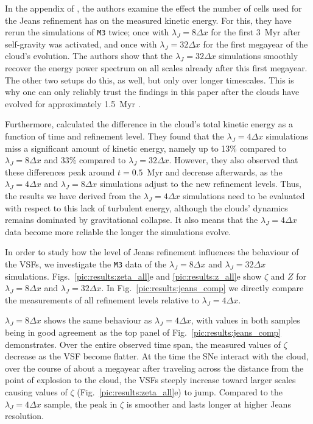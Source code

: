 In the appendix of , the authors examine the effect the number of cells used for the Jeans refinement has on the measured kinetic energy.
For this, they have rerun the simulations of \texttt{M3} twice; 
once with $\lambda_J=8\Delta{}x$ for the first 3~Myr after self-gravity was activated, and once with $\lambda_J=32\Delta{}x$ for the first megayear of the cloud's evolution.
The authors show that the $\lambda_J=32\Delta{}x$ simulations smoothly recover the energy power spectrum on all scales already after this first megayear.
The other two setups do this, as well, but only over longer timescales.
This is why one can only reliably trust the findings in this paper after the clouds have evolved for approximately 1.5~Myr \citep[see also][]{IbanezMejia2017,Seifried2017b}.

Furthermore,  calculated the difference in the cloud's total kinetic energy as a function of time and refinement level.
They found that the $\lambda_J = 4\Delta{}x$ simulations miss a significant amount of kinetic energy, namely up to 13\% compared to $\lambda_J = 8\Delta{}x$ and 33\% compared to $\lambda_J = 32\Delta{}x$.
However, they also observed that these differences peak around $t=0.5$~Myr and decrease afterwards, as the $\lambda_J = 4\Delta{}x$ and $\lambda_J = 8\Delta{}x$ simulations adjust to the new refinement levels.
Thus, the results we have derived from the $\lambda_J = 4\Delta{}x$ simulations need to be evaluated with respect to this lack of turbulent energy, although the clouds' dynamics remains dominated by gravitational collapse.
It also means that the $\lambda_J = 4\Delta{}x$ data become more reliable the longer the simulations evolve.

In order to study  how the level of Jeans refinement influences the behaviour of the VSFs, we investigate the \texttt{M3} data of the $\lambda_J = 8\Delta{}x$ and $\lambda_J = 32\Delta{}x$ simulations.
Figs.~\ref{pic:results:zeta_all}e and \ref{pic:results:z_all}e show $\zeta$ and $Z$ for  $\lambda_J = 8\Delta{}x$ and $\lambda_J = 32\Delta{}x$.
In Fig.~\ref{pic:results:jeans_comp} we directly compare the measurements of all refinement levels relative to $\lambda_J = 4\Delta{}x$.

$\lambda_J = 8\Delta{}x$ shows the same behaviour as $\lambda_J = 4\Delta{}x$, with values in both samples being in good agreement as the top panel of Fig.~\ref{pic:results:jeans_comp} demonstrates. 
Over the entire observed time span, the measured values of $\zeta$ decrease as the VSF become flatter.
At the time the SNe interact with the cloud, over the course of about a megayear after traveling across the distance from the point of explosion to the cloud, the VSFs steeply increase toward larger scales causing values of $\zeta$ (Fig.~\ref{pic:results:zeta_all}e) to jump.
Compared to the $\lambda_J = 4\Delta{}x$ sample, the peak in $\zeta$ is smoother and lasts longer at higher Jeans resolution.

